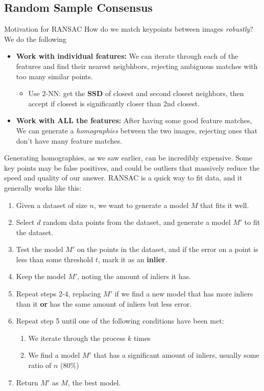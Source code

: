 \documentclass{article}
\begin{document}
\subsection{Random Sample Consensus}
Motivation for RANSAC How do we match keypoints between images \textit{robustly}? We do the following
\begin{itemize}
    \item \textbf{Work with individual features:} We can iterate through each of the features and find their nearest neigbhbors, rejecting ambiguous matches with too many similar points.
    \begin{itemize}
        \item Use 2-NN: get the \textbf{SSD} of closest and second closest neighbors, then accept if closest is significantly closer than 2nd closest. 
    \end{itemize}
    \item \textbf{Work with ALL the features:} After having some good feature matches, We can generate a \textit{homographies} between the two images, rejecting ones that don't have many feature matches.
\end{itemize}
Generating homographies, as we saw earlier, can be incredibly expensive. Some key points may be false positives, and could be outliers that massively reduce the speed and quality of our answer. RANSAC is a quick way to fit data, and it generally works like this:
\begin{enumerate}
    \item Given a dataset of size $n$, we want to generate a model $M$ that fits it well.
    \item Select $d$ random data points from the dataset, and generate a model $M'$ to fit the dataset. 
    \item Test the model $M'$ on the points in the dataset, and if the error on a point is less than some threshold $t$, mark it as an \textbf{inlier}.
    \item Keep the model $M'$, noting the amount of inliers it has. 
    \item Repeat steps 2-4, replacing $M'$ if we find a new model that has more inliers than it \textbf{or} has the same amount of inliers but less error.
    \item Repeat step 5 until one of the following conditions have been met:
    \begin{enumerate}
        \item We iterate through the process $k$ times
        \item We find a model $M'$ that has a significant amount of inliers, usually some ratio of $n$ (80\%)
    \end{enumerate}
    \item Return $M'$ as $M$, the best model.
\end{enumerate}
\end{document}

